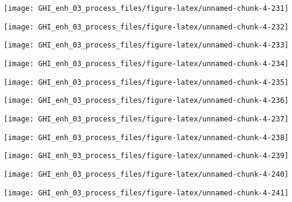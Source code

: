 \documentclass[
  10pt,
  a4paper,oneside]{article}
\begin{document}
\begin{center}\texttt{[image: GHI\_enh\_03\_process\_files/figure-latex/unnamed-chunk-4-231]} \end{center}

\begin{center}\texttt{[image: GHI\_enh\_03\_process\_files/figure-latex/unnamed-chunk-4-232]} \end{center}

\begin{center}\texttt{[image: GHI\_enh\_03\_process\_files/figure-latex/unnamed-chunk-4-233]} \end{center}

\begin{center}\texttt{[image: GHI\_enh\_03\_process\_files/figure-latex/unnamed-chunk-4-234]} \end{center}

\begin{center}\texttt{[image: GHI\_enh\_03\_process\_files/figure-latex/unnamed-chunk-4-235]} \end{center}

\begin{center}\texttt{[image: GHI\_enh\_03\_process\_files/figure-latex/unnamed-chunk-4-236]} \end{center}

\begin{center}\texttt{[image: GHI\_enh\_03\_process\_files/figure-latex/unnamed-chunk-4-237]} \end{center}

\begin{center}\texttt{[image: GHI\_enh\_03\_process\_files/figure-latex/unnamed-chunk-4-238]} \end{center}

\begin{center}\texttt{[image: GHI\_enh\_03\_process\_files/figure-latex/unnamed-chunk-4-239]} \end{center}

\begin{center}\texttt{[image: GHI\_enh\_03\_process\_files/figure-latex/unnamed-chunk-4-240]} \end{center}

\begin{center}\texttt{[image: GHI\_enh\_03\_process\_files/figure-latex/unnamed-chunk-4-241]} \end{center}
\end{document}
